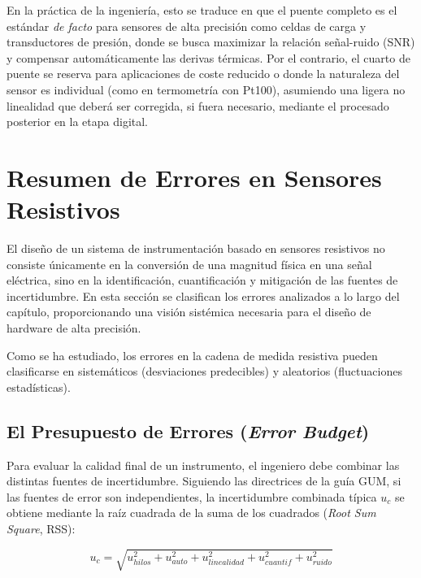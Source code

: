 En la práctica de la ingeniería, esto se traduce en que el puente completo es el estándar \emph{de facto} para sensores de alta precisión como celdas de carga y transductores de presión, donde se busca maximizar la relación señal-ruido (SNR) y compensar automáticamente las derivas térmicas. Por el contrario, el cuarto de puente se reserva para aplicaciones de coste reducido o donde la naturaleza del sensor es individual (como en termometría con Pt100), asumiendo una ligera no linealidad que deberá ser corregida, si fuera necesario, mediante el procesado posterior en la etapa digital.

\section{Resumen de Errores en Sensores Resistivos}\label{sec:errores_resistivos}

El diseño de un sistema de instrumentación basado en sensores resistivos no consiste únicamente en la conversión de una magnitud física en una señal eléctrica, sino en la identificación, cuantificación y mitigación de las fuentes de incertidumbre. En esta sección se clasifican los errores analizados a lo largo del capítulo, proporcionando una visión sistémica necesaria para el diseño de hardware de alta precisión.

Como se ha estudiado, los errores en la cadena de medida resistiva pueden clasificarse en sistemáticos (desviaciones predecibles) y aleatorios (fluctuaciones estadísticas). 

\subsection{El Presupuesto de Errores (\textit{Error Budget})}

Para evaluar la calidad final de un instrumento, el ingeniero debe combinar las distintas fuentes de incertidumbre. Siguiendo las directrices de la guía GUM, si las fuentes de error son independientes, la incertidumbre combinada típica $u_c$ se obtiene mediante la raíz cuadrada de la suma de los cuadrados (\textit{Root Sum Square}, RSS):

\begin{equation}\label{eq:error_budget}
    u_c = \sqrt{u_{hilos}^2 + u_{auto}^2 + u_{linealidad}^2 + u_{cuantif}^2 + u_{ruido}^2}
\end{equation}

